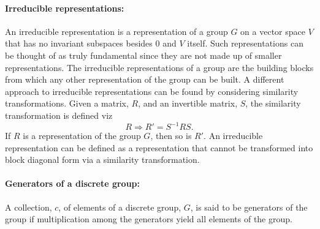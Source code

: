 \paragraph{Irreducible representations:} An irreducible representation is a representation of a group $G$ on a vector space $V$ that has no invariant subspaces besides $0$ and $V$ itself. Such representations can be thought of as truly fundamental since they are not made up of smaller representations. The irreducible representations of a group are the building blocks from which any other representation of the group can be built. A different approach to irreducible representations can be found by considering similarity transformations. Given a matrix, $R$, and an invertible matrix, $S$, the similarity transformation is defined viz
\begin{equation}
	R\Rightarrow R'=S^{-1}RS.
\end{equation} 
If $R$ is a representation of the group $G$, then so is $R'$. An irreducible representation can be defined as a representation that cannot be transformed into block diagonal form via a similarity transformation.  

\paragraph{Generators of a discrete group: }
A collection, $c$, of elements of a discrete group, $G$, is said to be generators of the group if multiplication among the generators yield all elements of the group. 
